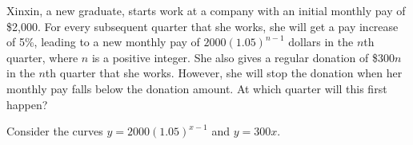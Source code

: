 \documentclass{jhwhw}
\begin{document}
            \begin{center}
            \end{center}


    \problem{}
        Xinxin, a new graduate, starts work at a company with an initial monthly pay of \$2,000. For every subsequent quarter that she works, she will get a pay increase of 5\%, leading to a new monthly pay of $2000(1.05)^{n-1}$ dollars in the $n$th quarter, where $n$ is a positive integer. She also gives a regular donation of \$$300n$ in the $n$th quarter that she works. However, she will stop the donation when her monthly pay falls below the donation amount. At which quarter will this first happen?

    \solution
        Consider the curves $y = 2000(1.05)^{x-1}$ and $y=300x$.
\end{document}
